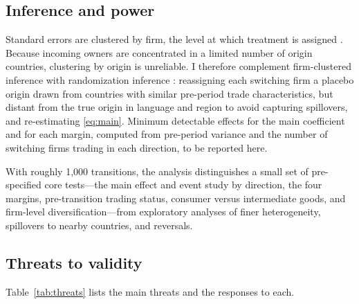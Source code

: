 \documentclass[12pt]{article}
\theoremstyle{remark}
\newcommand{\planned}[1]{\textcolor{OliveGreen}{#1}}
\begin{document}
\subsection{Inference and power}

Standard errors are clustered by firm, the level at which treatment is
assigned \citep{abadie2023}. Because incoming owners are concentrated in a
limited number of origin countries, clustering by origin is unreliable. I
therefore complement firm-clustered inference with randomization inference
\citep{young2019}: reassigning each switching firm a placebo origin drawn from
countries with similar pre-period trade characteristics, but distant from the
true origin in language and region to avoid capturing spillovers, and
re-estimating \eqref{eq:main}. \planned{Minimum detectable effects for the
main coefficient and for each margin, computed from pre-period variance and
the number of switching firms trading in each direction, to be reported here.}

With roughly 1,000 transitions, the analysis distinguishes a small set of
pre-specified core tests---the main effect and event study by direction, the
four margins, pre-transition trading status, consumer versus intermediate
goods, and firm-level diversification---from exploratory analyses of finer
heterogeneity, spillovers to nearby countries, and reversals.

\subsection{Threats to validity}

Table~\ref{tab:threats} lists the main threats and the responses to each.
\end{document}
